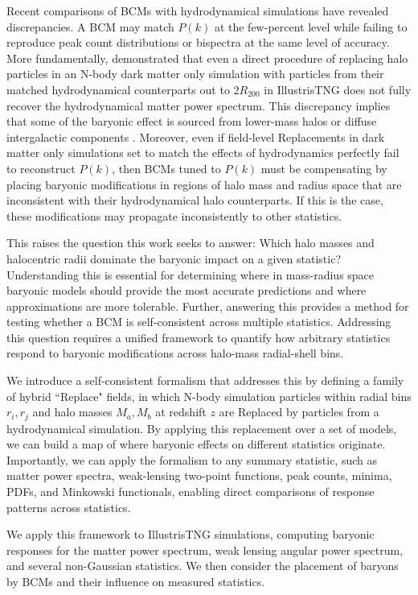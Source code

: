\documentclass[linenumbers,trackchanges]{aastex701}
\begin{document}
Recent comparisons of BCMs with hydrodynamical simulations have revealed discrepancies. A BCM may match $P(k)$ at the few-percent level while failing to reproduce peak count distributions \citep{leeComparingWeakLensing2022} or bispectra \citep{Arico+2021} at the same level of accuracy. More fundamentally, \citet{Miller-25} demonstrated that even a direct procedure of replacing halo particles in an N-body dark matter only simulation with particles from their matched hydrodynamical counterparts out to $2R_{200}$ in IllustrisTNG does not fully recover the hydrodynamical matter power spectrum. This discrepancy implies that some of the baryonic effect is sourced from lower-mass halos or diffuse intergalactic components \citep{Miller-25, Ayromlou-23}. Moreover, even if field-level Replacements in dark matter only simulations set to match the effects of hydrodynamics perfectly fail to reconstruct $P(k)$, then BCMs tuned to $P(k)$ must be compensating by placing baryonic modifications in regions of halo mass and radius space that are inconsistent with their hydrodynamical halo counterparts. If this is the case, these modifications may propagate inconsistently to other statistics.

This raises the question this work seeks to answer: Which halo masses and halocentric radii dominate the baryonic impact on a given statistic? Understanding this is essential for determining where in mass-radius space baryonic models should provide the most accurate predictions and where approximations are more tolerable. Further, answering this provides a method for testing whether a BCM is self-consistent across multiple statistics. Addressing this question requires a unified framework to quantify how arbitrary statistics respond to baryonic modifications across halo-mass radial-shell bins.

We introduce a self-consistent formalism that addresses this by defining a family of hybrid ``Replace" fields, in which N-body simulation particles within radial bins $r_i, r_j$ and halo masses $M_a, M_b$ at redshift $z$ are Replaced by particles from a hydrodynamical simulation. By applying this replacement over a set of models, we can build a map of where baryonic effects on different statistics originate. Importantly, we can apply the formalism to any summary statistic, such as matter power spectra, weak-lensing two-point functions, peak counts, minima, PDFs, and Minkowski functionals, enabling direct comparisons of response patterns across statistics.

We apply this framework to IllustrisTNG simulations, computing baryonic responses for the matter power spectrum, weak lensing angular power spectrum, and several non-Gaussian statistics. We then consider the placement of baryons by BCMs and their influence on measured statistics.
\end{document}

